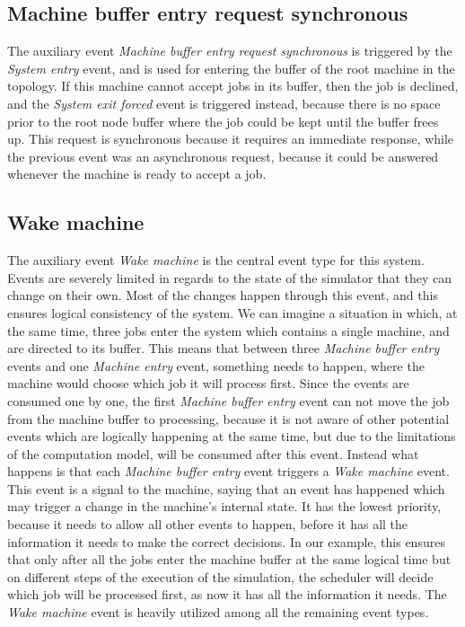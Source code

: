 \subsection{Machine buffer entry request synchronous}
The auxiliary event \textit{Machine buffer entry request synchronous} is triggered by the \textit{System entry} event, and is used for entering the buffer of the root machine in the topology. If this machine cannot accept jobs in its buffer, then the job is declined, and the \textit{System exit forced} event is triggered instead, because there is no space prior to the root node buffer where the job could be kept until the buffer frees up. This request is synchronous because it requires an immediate response, while the previous event was an asynchronous request, because it could be answered whenever the machine is ready to accept a job.

\subsection{Wake machine}
The auxiliary event \textit{Wake machine} is the central event type for this system. Events are severely limited in regards to the state of the simulator that they can change on their own. Most of the changes happen through this event, and this ensures logical consistency of the system. We can imagine a situation in which, at the same time, three jobs enter the system which contains a single machine, and are directed to its buffer. This means that between three \textit{Machine buffer entry} events and one \textit{Machine entry} event, something needs to happen, where the machine would choose which job it will process first. Since the events are consumed one by one, the first \textit{Machine buffer entry} event can not move the job from the machine buffer to processing, because it is not aware of other potential events which are logically happening at the same time, but due to the limitations of the computation model, will be consumed after this event. Instead what happens is that each \textit{Machine buffer entry} event triggers a \textit{Wake machine} event. This event is a signal to the machine, saying that an event has happened which may trigger a change in the machine's internal state. It has the lowest priority, because it needs to allow all other events to happen, before it has all the information it needs to make the correct decisions. In our example, this ensures that only after all the jobs enter the machine buffer at the same logical time but on different steps of the execution of the simulation, the scheduler will decide which job will be processed first, as now it has all the information it needs. The \textit{Wake machine} event is heavily utilized among all the remaining event types.

